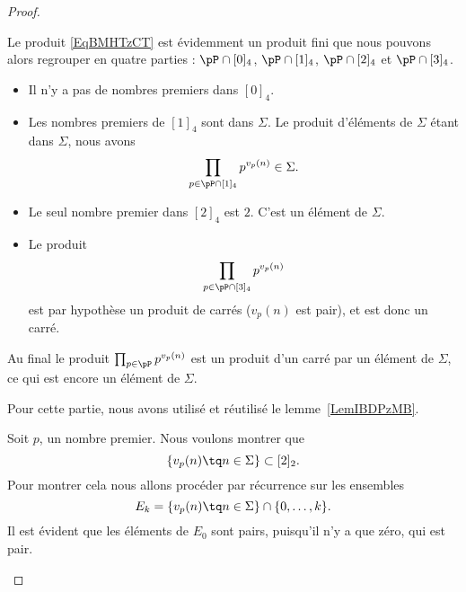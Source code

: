 \begin{proof}
	\begin{subproof}

		Le produit \eqref{EqBMHTzCT} est évidemment un produit fini que nous pouvons alors regrouper en quatre parties : \( \pP\cap[0]_4\), \( \pP\cap[1]_4\), \( \pP\cap[2]_4\) et \( \pP\cap[3]_4\).

		\begin{itemize}
			\item Il n'y a pas de nombres premiers dans \( [0]_4\).
			\item Les nombres premiers de \( [1]_4\) sont dans \( \Sigma\). Le produit d'éléments de \( \Sigma\) étant dans \( \Sigma\), nous avons
			      \begin{equation}
				      \prod_{p\in\pP\cap[1]_4}p^{v_p(n)}\in \Sigma.
			      \end{equation}
			\item
			      Le seul nombre premier dans \( [2]_4\) est \( 2\). C'est un élément de \( \Sigma\).
			\item
			      Le produit
			      \begin{equation}
				      \prod_{p\in\pP\cap[3]_4}p^{v_p(n)}
			      \end{equation}
			      est par hypothèse un produit de carrés (\( v_p(n)\) est pair), et est donc un carré.
		\end{itemize}
		Au final le produit \( \prod_{p\in\pP}p^{v_p(n)}\) est un produit d'un carré par un élément de \( \Sigma\), ce qui est encore un élément de \( \Sigma\).

		Pour cette partie, nous avons utilisé et réutilisé le lemme~\ref{LemIBDPzMB}.


		Soit \( p\), un nombre premier. Nous voulons montrer que
		\begin{equation}
			\{ v_p(n)\tq n\in \Sigma \}\subset [2]_2.
		\end{equation}
		Pour montrer cela nous allons procéder par récurrence sur les ensembles
		\begin{equation}
			E_k=\{ v_p(n)\tq n\in \Sigma \}\cap\{ 0,\ldots, k \}.
		\end{equation}
		Il est évident que les éléments de \( E_0\) sont pairs, puisqu'il n'y a que zéro, qui est pair.


\end{subproof}
\end{proof}
